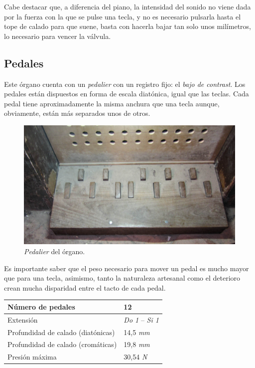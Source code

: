\smallskip

Cabe destacar que, a diferencia del piano, la intensidad del sonido no viene dada por la fuerza con la que se pulse una tecla, y no es necesario pulsarla hasta el tope de calado para que suene, basta con hacerla bajar tan solo unos milímetros, lo necesario para vencer la válvula.

\subsection{Pedales}

Este órgano cuenta con un \textit{pedalier} con un registro fijo: el \textit{bajo de contrast}. Los pedales están dispuestos en forma de escala diatónica, igual que las teclas. Cada pedal tiene aproximadamente la misma anchura que una tecla aunque, obviamente, están más separados unos de otros.

\smallskip

\begin{figure}[H]
	\noindent \begin{centering}
		\includegraphics[width=\linewidth*3/4]{capitulo3/pedalier}
		\par\end{centering}
	\smallskip
	\caption{\label{fig:pedalier} \textit{Pedalier} del órgano.}
\end{figure} 

\smallskip

Es importante saber que el peso necesario para mover un pedal es mucho mayor que para una tecla, asimismo, tanto la naturaleza artesanal como el deterioro crean mucha disparidad entre el tacto de cada pedal.

\begin{center}
	\begin{tabular}{|l|l|}
		\hline Número de pedales & 12 \\ 
		\hline Extensión & \textit{Do 1} -- \textit{Si 1} \\ 
		\hline Profundidad de calado (diatónicas) & 14,5 \textit{mm} \\ 
		\hline Profundidad de calado (cromáticas) & 19,8 \textit{mm} \\
		\hline Presión máxima & 30,54 \textit{N} \\
		\hline 
	\end{tabular} 
\end{center}

